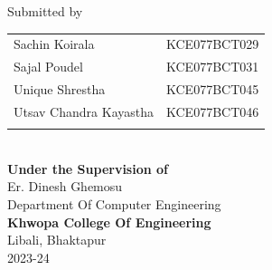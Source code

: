 \begin{center}
    \vspace{0.2in}
    \large{Submitted by}\\
    \begin{tabular}{p{3.5in}p{3in}}
        \hspace{0.3cm}Sachin Koirala & KCE077BCT029\\
        \hspace{0.3cm}Sajal Poudel & KCE077BCT031\\
        \hspace{0.3cm}Unique Shrestha & KCE077BCT045\\
        \hspace{0.3cm}Utsav Chandra Kayastha &KCE077BCT046\\
     \vspace{0.2in}
    \end{tabular}
    \\
    \vspace{1cm}
    \large{\textbf{Under the Supervision of}\\}
        \normalsize{Er. Dinesh Ghemosu\\
            Department Of Computer Engineering\\
        }
        \vspace{2cm}
    \large{\textbf{Khwopa College Of Engineering}\\}
        \normalsize{Libali, Bhaktapur\\
        2023-24
    }
\end{center}
